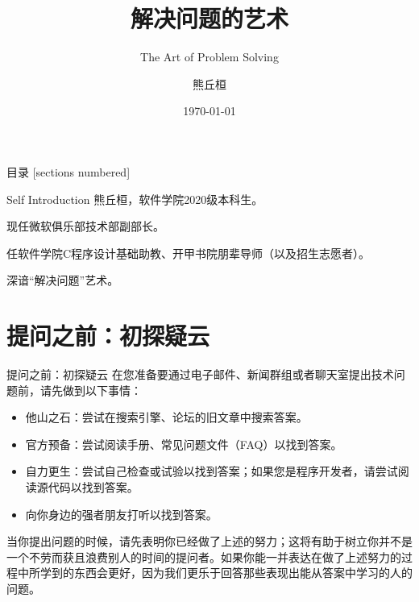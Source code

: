 \documentclass[10pt]{beamer}
\title{解决问题的艺术}
\subtitle{The Art of Problem Solving}
\date{\today}
\author{熊丘桓}
\institute{南京大学微软俱乐部}
\begin{document}
\maketitle

\begin{frame}{目录}
    [sections numbered]
    \tableofcontents[hideallsubsections]
\end{frame}


\begin{frame}[fragile]{Self Introduction}
    熊丘桓，软件学院2020级本科生。

    现任微软俱乐部技术部副部长。

    任软件学院C程序设计基础助教、开甲书院朋辈导师（以及招生志愿者）。

    深谙“解决问题”艺术。
\end{frame}

\section{提问之前：初探疑云}

\begin{frame}[fragile]{提问之前：初探疑云}
    在您准备要通过电子邮件、新闻群组或者聊天室提出技术问题前，请先做到以下事情：
    \begin{itemize}
        \item 他山之石：尝试在搜索引擎、论坛的旧文章中搜索答案。
        \item 官方预备：尝试阅读手册、常见问题文件（FAQ）以找到答案。
        \item 自力更生：尝试自己检查或试验以找到答案；如果您是程序开发者，请尝试阅读源代码以找到答案。
        \item 向你身边的强者朋友打听以找到答案。
    \end{itemize}

    当你提出问题的时候，请先表明你已经做了上述的努力；这将有助于树立你并不是一个不劳而获且浪费别人的时间的提问者。如果你能一并表达在做了上述努力的过程中所学到的东西会更好，因为我们更乐于回答那些表现出能从答案中学习的人的问题。
\end{frame}
\end{document}

